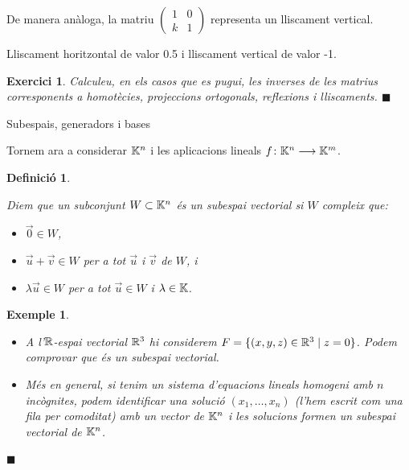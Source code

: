 \documentclass[
  11pt,
]{book}
\makeatletter
\numberwithin{dummy}{section}
\theoremstyle{maincolornumbox}
\newtheorem{exerciseT}{Exercici}[chapter]
\theoremstyle{blacknumex}
\newtheorem{exampleT}{Exemple}[chapter]
\theoremstyle{blacknumbox}
\newtheorem{definitionT}{Definició}[chapter]
\theoremstyle{maincolornum}
\newenvironment{exercise}{\begin{eBox}\begin{exerciseT}}{\hfill{\color{maincolor}\tiny\ensuremath{\blacksquare}}\end{exerciseT}\end{eBox}}
\newenvironment{definition}{\begin{dBox}\begin{definitionT}}{\end{definitionT}\end{dBox}}
\newenvironment{example}{\begin{exampleT}}{\hfill{\tiny\ensuremath{\blacksquare}}\end{exampleT}}
\renewcommand{\section}{\@startsection{section}{1}{\z@}
{-4ex \@plus -1ex \@minus -.4ex}
{1ex \@plus.2ex }
{\normalfont\large\sffamily\bfseries}}
\newlength\esp
\makeatother
\begin{document}
De manera anàloga, la matriu \(\begin{pmatrix}1&0\\k&1\end{pmatrix}\)
representa un lliscament vertical.

Lliscament horitzontal de valor {0.5} i lliscament vertical de valor {-1}.

\begin{exercise}
Calculeu, en els casos que es pugui, les inverses de les matrius
corresponents a homotècies, projeccions ortogonals, reflexions i
lliscaments.
\end{exercise}

\hypertarget{subespais-generadors-i-bases}{%
\section{Subespais, generadors i bases}\label{subespais-generadors-i-bases}}

Tornem ara a considerar \(\mathbb{K}^n\) i les aplicacions lineals
\(f\colon \mathbb{K}^n\longrightarrow\mathbb{K}^m\).

\begin{definition}
\protect\hypertarget{def:subespai}{}\label{def:subespai}

Diem que un subconjunt
\emph{\(W\subset \mathbb{K}^n\) és un subespai vectorial} si \(W\) compleix que:

\begin{itemize}
\item
  \(\vec 0 \in W\),
\item
  \(\vec u+\vec v \in W\) per a tot \(\vec u\) i \(\vec v\) de \(W\), i
\item
  \(\lambda \vec u\in W\) per a tot \(\vec u\in W\) i \(\lambda\in\mathbb{K}\).
\end{itemize}

\end{definition}

\begin{example}
\leavevmode

\begin{itemize}
\item
  A l'\(\mathbb{R}\)-espai vectorial \(\mathbb{R}^3\) hi considerem
  \(F=\{(x,y,z) \in \mathbb{R}^3 \mid z=0\}\). Podem comprovar que és un
  subespai vectorial.
\item
  Més en general, si tenim un sistema d'equacions lineals homogeni amb
  \(n\) incògnites, podem identificar una solució \((x_1,\dots,x_n)\)
  (l'hem escrit com una fila per comoditat) amb un vector de \(\mathbb{K}^n\) i
  les solucions formen un subespai vectorial de \(\mathbb{K}^n\).
\end{itemize}

\end{example}
\end{document}
